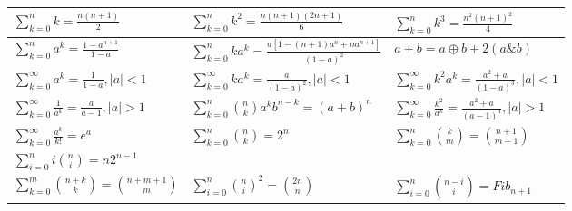 \def\arraystretch{3}
{\normalsize
  \begin{center}
    \begin{tabular}{| >{\centering}m{5cm}| >{\centering}m{5cm}| >{\centering}m{5cm}|}
      \hline
      $\sum_{k = 0}^n k = \frac{n(n + 1)}{2}$
       &
      $\sum_{k = 0}^n k^2 = \frac{n(n + 1)(2n + 1)}{6}$
       &
      $\sum_{k = 0}^n k^3 = \frac{n^2(n + 1)^2}{4}$
      \tabularnewline \hline
      $\sum_{k = 0}^n a^k = \frac{1 - a^{n + 1}}{1 - a}$
       &
      $\sum_{k = 0}^n ka^k = \frac{a[1 - (n + 1)a^n + na^{n + 1}]}{(1 - a)^2}$
       &
      $ a + b = a \oplus b + 2(a \& b)$
      \tabularnewline \hline
      $\sum_{k = 0}^\infty a^k = \frac{1}{1 - a}, |a| < 1$
       &
      $\sum_{k = 0}^\infty ka^k = \frac{a}{(1 - a)^2}, |a| < 1$
       &
      $\sum_{k = 0}^\infty k^2a^k = \frac{a^2 + a}{(1 - a)^3}, |a| < 1$
      \tabularnewline \hline
      $\sum_{k = 0}^\infty \frac{1}{a^k} = \frac{a}{a - 1}, |a| > 1$
       &
      $\sum_{k = 0}^n \binom{n}{k} a^k b^{n-k} = (a+b)^n $
       &
      $\sum_{k = 0}^\infty \frac{k^2}{a^k} = \frac{a^2 + a}{(a - 1)^3}, |a| > 1$
      \tabularnewline \hline
      $\sum_{k = 0}^\infty \frac{a^k}{k!} = e^a$
       &
      $\sum_{k = 0}^n \binom{n}{k} = 2^n$
       &
      $\sum_{k = 0}^n \binom{k}{m} = \binom{n + 1}{m + 1}$
      \tabularnewline \hline
      $\sum_{i=0}^{n} i \binom{n}{i} = n2^{n-1}$
      &
      \multicolumn{2}{c|}{
      $\sum_{k=1}^n k^p = \frac{1}{p+1} \sum_{j=0}^p (-1)^j{p+1 \choose j} B_j n^{p+1-j}$}
      \tabularnewline \hline
      $\sum_{k=0}^{m} \binom{n+k}{k} = \binom{n+m+1}{m}$
      &
      $\sum_{i=0}^{n} \binom{n}{i}^2 = \binom{2n}{n}$
      &
      $\sum_{i=0}^{n}  \binom{n-i}{i} = Fib_{n+1}$
      \tabularnewline \hline
    \end{tabular}
  \end{center}
}
